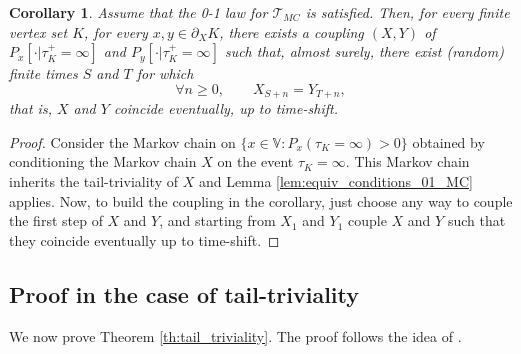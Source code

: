 \documentclass[12pt,a4paper]{article}
\newtheorem{corollary}[theo]{Corollary}
\newcommand{\1}[1]{{\mathbf 1}{\{#1\}}}
\newcommand{\8}{{\infty}}
\begin{document}
\begin{corollary}\label{cor:coincide_up_time_shift}
  Assume that the 0-1 law for $\mathcal{T}_{MC}$ is satisfied. 
  Then, for every finite vertex set $K$, for every $x, y\in \partial_X K$, there exists a coupling $(X, Y)$ of $P_x[\cdot | \tau_K^+=\infty]$ and $P_y[\cdot | \tau_K^+=\infty]$ such that, almost surely, there exist (random) finite times $S$ and $T$ for which
  \begin{equation}
    \forall n\ge 0 , \qquad  X_{S+n}=Y_{T+n}, 
  \end{equation} 
  that is, $X$ and $Y$ coincide eventually, up to time-shift. 
\end{corollary}
\begin{proof}
  Consider the Markov chain on $\{x\in \mathbb{V}: P_x(\tau_K=\infty)>0\}$ obtained by conditioning the Markov chain $X$ on the event $\tau_K=\infty$. This Markov chain inherits the tail-triviality of $X$ and Lemma \ref{lem:equiv_conditions_01_MC} applies. 
  Now, to build the coupling in the corollary, just choose any way to couple the first step of $X$ and $Y$, and starting from $X_1$ and $Y_1$ couple $X$ and $Y$ such that they coincide eventually up to time-shift. 
\end{proof}

\subsection{Proof in the case of tail-triviality}\label{sec:proof_tail_triviality}

We now prove Theorem \ref{th:tail_triviality}. The proof follows the idea of \cite{Collin2024}.
\end{document}
